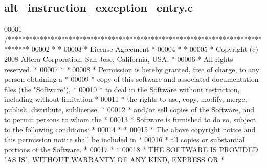 \subsection{alt\+\_\+instruction\+\_\+exception\+\_\+entry.\+c}
\label{alt__instruction__exception__entry_8c_source}

\begin{DoxyCode}
00001 \textcolor{comment}{/******************************************************************************}
00002 \textcolor{comment}{*                                                                             *}
00003 \textcolor{comment}{* License Agreement                                                           *}
00004 \textcolor{comment}{*                                                                             *}
00005 \textcolor{comment}{* Copyright (c) 2008 Altera Corporation, San Jose, California, USA.           *}
00006 \textcolor{comment}{* All rights reserved.                                                        *}
00007 \textcolor{comment}{*                                                                             *}
00008 \textcolor{comment}{* Permission is hereby granted, free of charge, to any person obtaining a     *}
00009 \textcolor{comment}{* copy of this software and associated documentation files (the "Software"),  *}
00010 \textcolor{comment}{* to deal in the Software without restriction, including without limitation   *}
00011 \textcolor{comment}{* the rights to use, copy, modify, merge, publish, distribute, sublicense,    *}
00012 \textcolor{comment}{* and/or sell copies of the Software, and to permit persons to whom the       *}
00013 \textcolor{comment}{* Software is furnished to do so, subject to the following conditions:        *}
00014 \textcolor{comment}{*                                                                             *}
00015 \textcolor{comment}{* The above copyright notice and this permission notice shall be included in  *}
00016 \textcolor{comment}{* all copies or substantial portions of the Software.                         *}
00017 \textcolor{comment}{*                                                                             *}
00018 \textcolor{comment}{* THE SOFTWARE IS PROVIDED "AS IS", WITHOUT WARRANTY OF ANY KIND, EXPRESS OR  *}

\end{DoxyCode}
